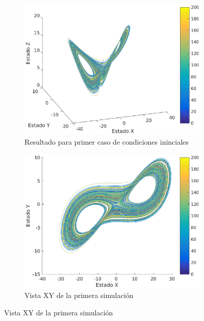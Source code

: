 \documentclass[12pt,letterpaper]{article}
\begin{document}
\begin{figure}
	\centering
	\begin{subfigure}[t]{0.36\textwidth}
		\includegraphics[width=\textwidth]{pictures/primera_simulacion}
		\caption{Resultado para primer caso de condiciones ininciales}
		\label{fig:simulacion1}
	\end{subfigure}
	\begin{subfigure}[t]{0.36\textwidth}
		\includegraphics[width=\textwidth]{pictures/primera_simulacion_xy}
		\caption{Vista XY de la primera simulación}
		\label{fig:simulacion1xy}

\end{subfigure}
\end{figure}
\end{document}
